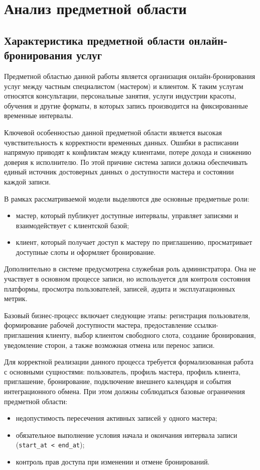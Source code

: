 \section{Анализ предметной области}
\subsection{Характеристика предметной области онлайн-бронирования услуг}

Предметной областью данной работы является организация онлайн-бронирования услуг между частным специалистом (мастером) и клиентом. К таким услугам относятся консультации, персональные занятия, услуги индустрии красоты, обучения и другие форматы, в которых запись производится на фиксированные временные интервалы.

Ключевой особенностью данной предметной области является высокая чувствительность к корректности временных данных. Ошибки в расписании напрямую приводят к конфликтам между клиентами, потере дохода и снижению доверия к исполнителю. По этой причине система записи должна обеспечивать единый источник достоверных данных о доступности мастера и состоянии каждой записи.

В рамках рассматриваемой модели выделяются две основные предметные роли:
\begin{itemize}
\item мастер, который публикует доступные интервалы, управляет записями и взаимодействует с клиентской базой;
\item клиент, который получает доступ к мастеру по приглашению, просматривает доступные слоты и оформляет бронирование.
\end{itemize}

Дополнительно в системе предусмотрена служебная роль администратора. Она не участвует в основном процессе записи, но используется для контроля состояния платформы, просмотра пользователей, записей, аудита и эксплуатационных метрик.

Базовый бизнес-процесс включает следующие этапы: регистрация пользователя, формирование рабочей доступности мастера, предоставление ссылки-приглашения клиенту, выбор клиентом свободного слота, создание бронирования, уведомление сторон, а также возможная отмена или перенос записи.

Для корректной реализации данного процесса требуется формализованная работа с основными сущностями: пользователь, профиль мастера, профиль клиента, приглашение, бронирование, подключение внешнего календаря и события интеграционного обмена. При этом должны соблюдаться базовые ограничения предметной области:
\begin{itemize}
\item недопустимость пересечения активных записей у одного мастера;
\item обязательное выполнение условия начала и окончания интервала записи (\texttt{start\_at < end\_at});
\item контроль прав доступа при изменении и отмене бронирований.
\end{itemize}

